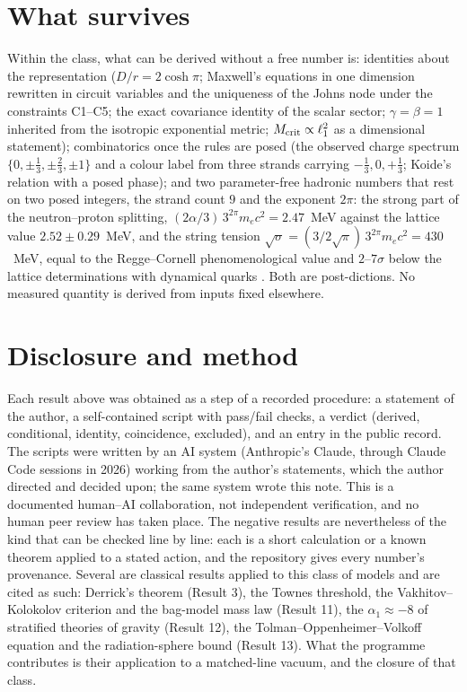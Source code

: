 \documentclass[11pt,a4paper]{article}
\newcommand{\lone}{\ensuremath{\ell_1}}
\begin{document}
\section{What survives}
Within the class, what can be derived without a free number is: identities about the representation ($D/r = 2\cosh\pi$; Maxwell's equations in one dimension rewritten in circuit variables and the uniqueness of the Johns node under the constraints C1--C5; the exact covariance identity of the scalar sector; $\gamma = \beta = 1$ inherited from the isotropic exponential metric; $M_{\rm crit}\propto\lone^2$ as a dimensional statement); combinatorics once the rules are posed (the observed charge spectrum $\{0, \pm\tfrac13, \pm\tfrac23, \pm1\}$ and a colour label from three strands carrying $-\tfrac13, 0, +\tfrac13$; Koide's relation with a posed phase); and two parameter-free hadronic numbers that rest on two posed integers, the strand count $9$ and the exponent $2\pi$: the strong part of the neutron--proton splitting, $(2\alpha/3)\,3^{2\pi}m_ec^2 = 2.47$~MeV against the lattice value $2.52 \pm 0.29$~MeV, and the string tension $\sqrt\sigma = (3/2\sqrt\pi)\,3^{2\pi}m_ec^2 = 430$~MeV, equal to the Regge--Cornell phenomenological value and $2$--$7\sigma$ below the lattice determinations with dynamical quarks \cite{bulava2024}. Both are post-dictions. No measured quantity is derived from inputs fixed elsewhere.

\section{Disclosure and method}
Each result above was obtained as a step of a recorded procedure: a statement of the author, a self-contained script with pass/fail checks, a verdict (derived, conditional, identity, coincidence, excluded), and an entry in the public record. The scripts were written by an AI system (Anthropic's Claude, through Claude Code sessions in 2026) working from the author's statements, which the author directed and decided upon; the same system wrote this note. This is a documented human--AI collaboration, not independent verification, and no human peer review has taken place. The negative results are nevertheless of the kind that can be checked line by line: each is a short calculation or a known theorem applied to a stated action, and the repository gives every number's provenance. Several are classical results applied to this class of models and are cited as such: Derrick's theorem (Result 3), the Townes threshold, the Vakhitov--Kolokolov criterion and the bag-model mass law (Result 11), the $\alpha_1 \approx -8$ of stratified theories of gravity (Result 12), the Tolman--Oppenheimer--Volkoff equation and the radiation-sphere bound (Result 13). What the programme contributes is their application to a matched-line vacuum, and the closure of that class.
\end{document}
